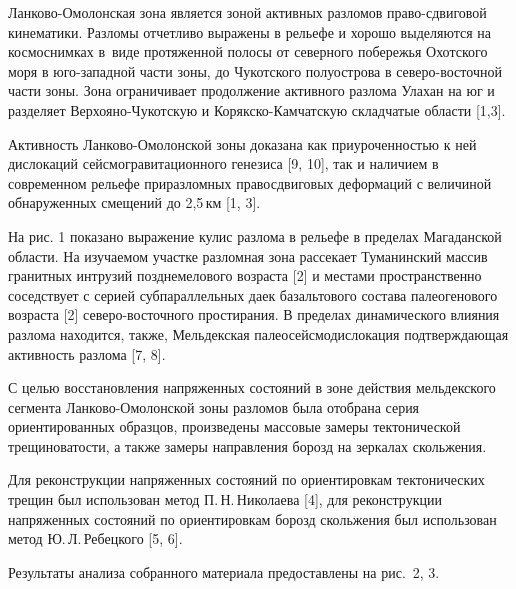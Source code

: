 



\makeProcTitleII



Ланково-Омолонская зона является зоной активных разломов право-сдвиговой
кинематики. Разломы отчетливо выражены в рельефе и хорошо выделяются на космоснимках
в~виде протяженной полосы от северного побережья Охотского моря в юго-западной
части зоны, до Чукотского полуострова в северо-восточной части зоны.
Зона ограничивает продолжение активного разлома Улахан на юг и разделяет
Верхояно-Чукотскую и Корякско-Камчатскую складчатые области [1,3].


Активность Ланково-Омолонской зоны доказана как приуроченностью к ней
дислокаций сейсмогравитационного генезиса [9, 10], так и наличием в современном рельефе приразломных правосдвиговых деформаций
с величиной обнаруженных смещений до 2,5\,км [1, 3].

На рис. 1 показано выражение кулис разлома в рельефе в пределах Магаданской области.
На изучаемом участке разломная зона рассекает Туманинский массив
гранитных интрузий позднемелового возраста [2]
и местами пространственно соседствует с серией субпараллельных даек
базальтового состава палеогенового возраста [2] северо-восточного простирания.
В пределах динамического влияния разлома находится, также, Мельдекская
палеосейсмодислокация подтверждающая активность разлома [7, 8].


\clearpage
С целью восстановления напряженных состояний в зоне действия мельдекского
сегмента Ланково-Омолонской зоны разломов была отобрана серия ориентированных
образцов, произведены массовые замеры тектонической трещиноватости, а также
замеры направления борозд  на зеркалах скольжения.

Для реконструкции напряженных состояний по ориентировкам тектонических трещин был использован метод П.\,Н.\,Николаева [4], для реконструкции напряженных состояний по ориентировкам борозд скольжения был использован метод Ю.\,Л.\,Ребецкого [5, 6].

Результаты анализа собранного материала предоставлены на рис.~2, 3.


